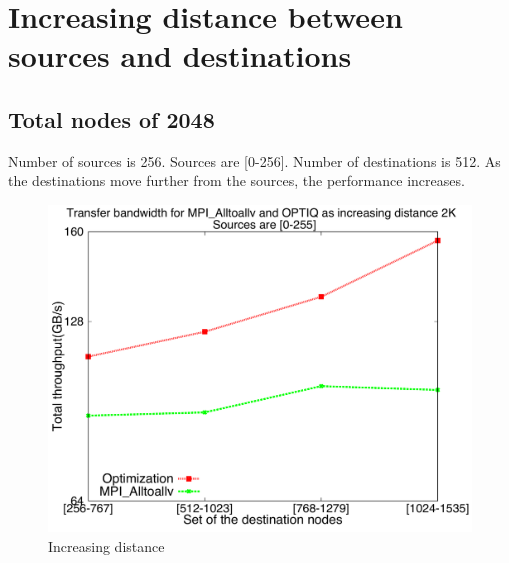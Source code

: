 \documentclass[letter]{article}
\begin{document}
\clearpage
\newpage

\section {Increasing distance between sources and destinations}

\subsection{Total nodes of 2048}

Number of sources is 256. Sources are [0-256]. Number of destinations is 512. As the destinations move further from the sources, the performance increases.

\begin{figure}[h]
\vspace{-0.1in}
\centering
\includegraphics[scale=0.30]{report_figures/incrdist/incrdist_2k.pdf}
\vspace{-0.1in}
\caption{Increasing distance}
\vspace{-0.1in}
\label{fig:incrdist}
\end{figure}
\end{document}
